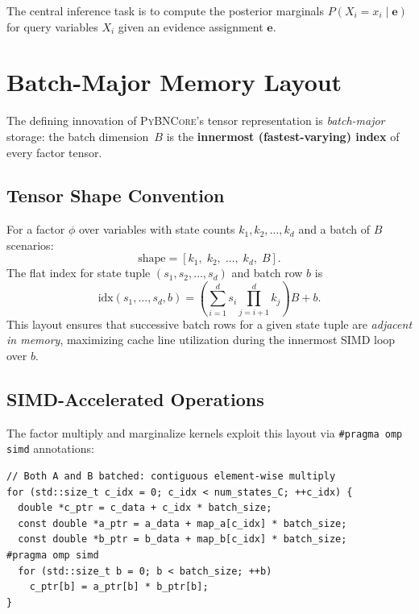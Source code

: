 \documentclass[11pt, letterpaper]{article}
\newcommand{\bncore}{\textsc{PyBNCore}}
\theoremstyle{definitionstyle}
\begin{document}
\noindent
The central inference task is to compute the posterior marginals
$P(X_i = x_i \mid \mathbf{e})$ for query variables $X_i$ given an
evidence assignment $\mathbf{e}$.


\section{Batch-Major Memory Layout}
\label{sec:memory}

The defining innovation of \bncore{}'s tensor representation is
\emph{batch-major} storage: the batch dimension~$B$ is the \textbf{innermost
(fastest-varying) index} of every factor tensor.

\subsection{Tensor Shape Convention}

For a factor $\phi$ over variables with state counts $k_1, k_2, \ldots, k_d$
and a batch of $B$ scenarios:
\[
  \text{shape} = [k_1,\; k_2,\; \ldots,\; k_d,\; B].
\]
The flat index for state tuple $(s_1, s_2, \ldots, s_d)$ and batch row $b$ is
\[
  \text{idx}(s_1,\ldots,s_d,b) = \left(\sum_{i=1}^{d} s_i \prod_{j=i+1}^{d} k_j\right)B + b.
\]
This layout ensures that successive batch rows for a given state tuple are
\emph{adjacent in memory}, maximizing cache line utilization during the
innermost SIMD loop over $b$.

\subsection{SIMD-Accelerated Operations}

The factor multiply and marginalize kernels exploit this layout via
\texttt{\#pragma omp simd} annotations:

\begin{lstlisting}[style=cppstyle, caption={Branch-free SIMD factor multiply kernel (batch path) in \texttt{factor.cpp}. One of four specializations; this path handles both operands batched.}]
// Both A and B batched: contiguous element-wise multiply
for (std::size_t c_idx = 0; c_idx < num_states_C; ++c_idx) {
  double *c_ptr = c_data + c_idx * batch_size;
  const double *a_ptr = a_data + map_a[c_idx] * batch_size;
  const double *b_ptr = b_data + map_b[c_idx] * batch_size;
#pragma omp simd
  for (std::size_t b = 0; b < batch_size; ++b)
    c_ptr[b] = a_ptr[b] * b_ptr[b];
}
\end{lstlisting}
\end{document}
